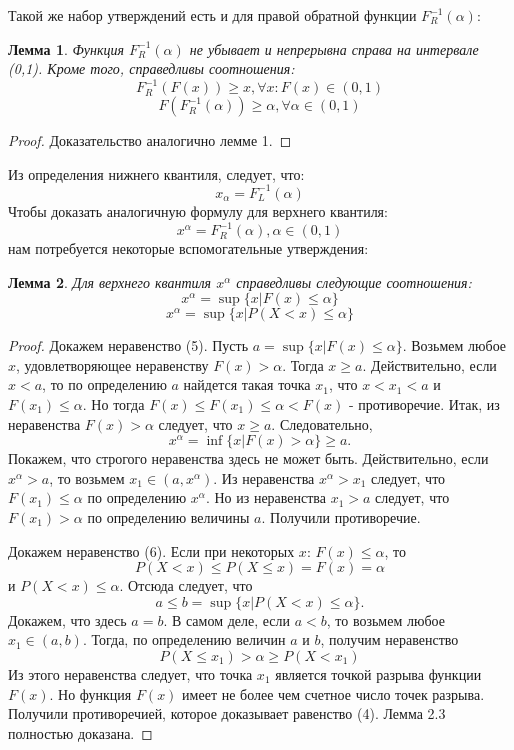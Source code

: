 \documentclass[14pt,a4paper]{article}
\theoremstyle{plain}
\newtheorem{Lemma}{Лемма}[section]
\theoremstyle{definition}
\begin{document}
Такой же набор утверждений есть и для правой обратной функции $F^{-1}_{R}(\alpha)$:
\begin{Lemma} \label{main} Функция $F^{-1}_{R}(\alpha)$ не убывает и непрерывна справа на интервале (0,1). Кроме того, справедливы соотношения:
\begin{equation}
F^{-1}_{R}(F(x))\ge x,  \forall x: F(x) \in (0,1)
\end{equation}
\begin{equation}
F(F^{-1}_{R}(\alpha)) \ge \alpha,  \forall \alpha \in (0,1)
\end{equation}
\end{Lemma}

\begin{proof}
Доказательство аналогично лемме 1.
\end{proof}

Из определения нижнего квантиля, следует, что:
$$
x_{\alpha} = F^{-1}_{L}(\alpha)
$$
Чтобы доказать аналогичную формулу для верхнего квантиля:
$$
x^{\alpha} = F^{-1}_{R}(\alpha), \alpha \in (0,1)
$$
нам потребуется некоторые вспомогательные утверждения:

\begin{Lemma} \label{main}
Для верхнего квантиля $x^{\alpha}$ справедливы следующие соотношения:
\begin{equation}
x^{\alpha} = \sup \{ x| F(x) \le \alpha \}
\end{equation}
\begin{equation}
x^{\alpha} = \sup \{ x| P(X<x) \le \alpha \}
\end{equation}
\end{Lemma}

\begin{proof}
 Докажем неравенство (5).
Пусть $a = \sup \{x|F(x) \le \alpha \}$.
Возьмем любое $x$, удовлетворяющее неравенству $F(x) > \alpha$.
Тогда $x \ge a$. Действительно, если $x<a$, то по определению $a$ найдется такая точка $x_1$, что $x < x_1 < a$ и $F(x_1) \le \alpha$. Но тогда $F(x) \le F(x_1) \le \alpha < F(x) $ - противоречие.
Итак, из неравенства $F(x)>\alpha$ следует, что $x \ge a$.
Следовательно,
$$
x^{\alpha} = \inf \{ x| F(x) > \alpha \} \ge a. $$
Покажем, что строгого неравенства здесь не может быть.
Действительно, если $x^{\alpha} > a$, то возьмем $x_1 \in (a, x^{\alpha})$. Из неравенства $x^{\alpha} > x_1$ следует, что $F(x_1) \le \alpha$ по определению $x^{\alpha}$. Но из неравенства $x_1 >a$ следует, что $F(x_1)>\alpha$ по определению величины $a$. Получили противоречие.

 Докажем неравенство (6).
Если при некоторых $x$: $F(x) \le \alpha$, то $$P(X<x) \le P(X \le x) = F(x) = \alpha$$ и $P(X < x) \le \alpha$.
Отсюда следует, что
$$
a \le b = \sup \{x| P(X<x) \le \alpha  \}.
$$
Докажем, что здесь $a=b$.
В самом деле, если $a<b$, то возьмем любое $x_1\in(a,b)$. Тогда, по определению величин $a$ и $b$, получим неравенство
$$
P(X\le x_1) > \alpha \ge P(X<x_1)
$$
Из этого неравенства следует, что точка $x_1$ является точкой разрыва функции $F(x)$. Но функция $F(x)$ имеет не более чем счетное число точек разрыва. Получили противоречией, которое доказывает равенство (4).
Лемма 2.3 полностью доказана.
\end{proof}
\end{document}
